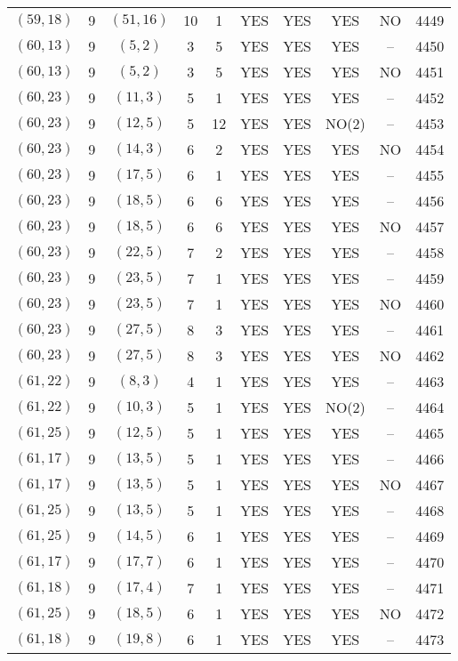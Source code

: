 \begin{longtable}{|c|c|c|c|c|c|c|c|c|c|}
$(59, 18)$ & 9 & $(51, 16)$ & 10 & 1 & YES & YES & YES & NO & 4449\\
$(60, 13)$ & 9 & $(5, 2)$ & 3 & 5 & YES & YES & YES & -- & 4450\\
$(60, 13)$ & 9 & $(5, 2)$ & 3 & 5 & YES & YES & YES & NO & 4451\\
$(60, 23)$ & 9 & $(11, 3)$ & 5 & 1 & YES & YES & YES & -- & 4452\\
$(60, 23)$ & 9 & $(12, 5)$ & 5 & 12 & YES & YES & NO(2) & -- & 4453\\
$(60, 23)$ & 9 & $(14, 3)$ & 6 & 2 & YES & YES & YES & NO & 4454\\
$(60, 23)$ & 9 & $(17, 5)$ & 6 & 1 & YES & YES & YES & -- & 4455\\
$(60, 23)$ & 9 & $(18, 5)$ & 6 & 6 & YES & YES & YES & -- & 4456\\
$(60, 23)$ & 9 & $(18, 5)$ & 6 & 6 & YES & YES & YES & NO & 4457\\
$(60, 23)$ & 9 & $(22, 5)$ & 7 & 2 & YES & YES & YES & -- & 4458\\
$(60, 23)$ & 9 & $(23, 5)$ & 7 & 1 & YES & YES & YES & -- & 4459\\
$(60, 23)$ & 9 & $(23, 5)$ & 7 & 1 & YES & YES & YES & NO & 4460\\
$(60, 23)$ & 9 & $(27, 5)$ & 8 & 3 & YES & YES & YES & -- & 4461\\
$(60, 23)$ & 9 & $(27, 5)$ & 8 & 3 & YES & YES & YES & NO & 4462\\
$(61, 22)$ & 9 & $(8, 3)$ & 4 & 1 & YES & YES & YES & -- & 4463\\
$(61, 22)$ & 9 & $(10, 3)$ & 5 & 1 & YES & YES & NO(2) & -- & 4464\\
$(61, 25)$ & 9 & $(12, 5)$ & 5 & 1 & YES & YES & YES & -- & 4465\\
$(61, 17)$ & 9 & $(13, 5)$ & 5 & 1 & YES & YES & YES & -- & 4466\\
$(61, 17)$ & 9 & $(13, 5)$ & 5 & 1 & YES & YES & YES & NO & 4467\\
$(61, 25)$ & 9 & $(13, 5)$ & 5 & 1 & YES & YES & YES & -- & 4468\\
$(61, 25)$ & 9 & $(14, 5)$ & 6 & 1 & YES & YES & YES & -- & 4469\\
$(61, 17)$ & 9 & $(17, 7)$ & 6 & 1 & YES & YES & YES & -- & 4470\\
$(61, 18)$ & 9 & $(17, 4)$ & 7 & 1 & YES & YES & YES & -- & 4471\\
$(61, 25)$ & 9 & $(18, 5)$ & 6 & 1 & YES & YES & YES & NO & 4472\\
$(61, 18)$ & 9 & $(19, 8)$ & 6 & 1 & YES & YES & YES & -- & 4473\\

\end{longtable}
